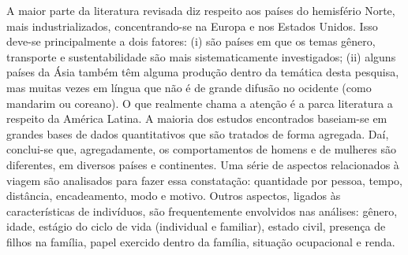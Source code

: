 A maior parte da literatura revisada diz respeito aos países do hemisfério Norte, mais industrializados, concentrando-se na Europa e nos Estados Unidos. Isso deve-se principalmente a dois fatores: (i) são países em que os temas gênero, transporte e sustentabilidade são mais sistematicamente investigados; (ii) alguns países da Ásia também têm alguma produção dentro da temática desta pesquisa, mas muitas vezes em língua que não é de grande difusão no ocidente (como mandarim ou coreano). O que realmente chama a atenção é a parca literatura a respeito da América Latina. A maioria dos estudos encontrados baseiam-se em grandes bases de dados quantitativos que são tratados de forma agregada. Daí, conclui-se que, agregadamente, os comportamentos de homens e de mulheres são diferentes, em diversos países e continentes. Uma série de aspectos relacionados à viagem são analisados para fazer essa constatação: quantidade por pessoa, tempo, distância, encadeamento, modo e motivo. Outros aspectos, ligados às características de indivíduos, são frequentemente envolvidos nas análises: gênero, idade, estágio do ciclo de vida (individual e familiar), estado civil, presença de filhos na família, papel exercido dentro da família, situação ocupacional e renda.






